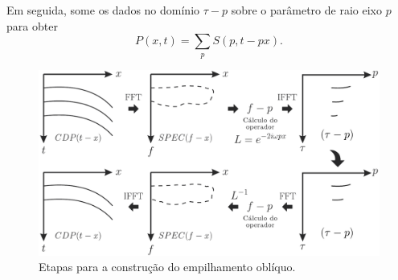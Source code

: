 Em seguida, some os dados no domínio $\tau - p$ sobre o parâmetro de raio eixo $p$ para obter
\begin{equation}
P(x, t)=\sum_{p} S(p, t-p x).
\label{eq:6_5b}
\end{equation}


\begin{figure}[H]
\centering
\includegraphics[width=15cm]{figuras/cap2/radon8.pdf}
\caption{Etapas para a construção do empilhamento oblíquo.}
\label{fig:radon8}
\end{figure}

